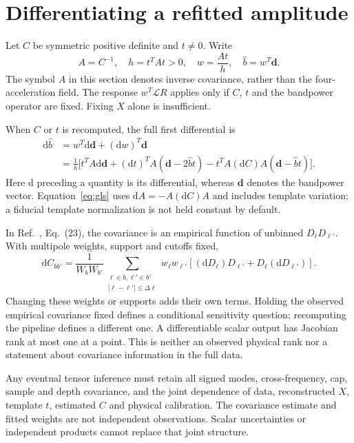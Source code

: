 \documentclass[aps,prd,reprint,onecolumn,notitlepage,nofootinbib]{revtex4-2}
\newcommand{\dd}{\mathrm d}
\newcommand{\vect}[1]{\boldsymbol{#1}}
\begin{document}
\section{Differentiating a refitted amplitude}

Let $C$ be symmetric positive definite and $t\ne0$. Write
\begin{equation}
 A=C^{-1},\quad h=t^TAt>0,\quad w=\frac{At}{h},\quad
 \widehat b=w^T\vect d.
\end{equation}
The symbol $A$ in this section denotes inverse covariance, rather than the four-acceleration field. The response $w^T\mathcal LR$ applies only if $C$, $t$ and the bandpower operator are fixed. Fixing $X$ alone is insufficient.

When $C$ or $t$ is recomputed, the full first differential is
\begin{align}\label{eq:gls}
 \dd\widehat b&=w^T\dd\vect d+(\dd w)^T\vect d\nonumber\\
 &=\frac{1}{h}\Big[
 t^TA\dd\vect d+(\dd t)^TA(\vect d-2\widehat b t)
 -t^TA(\dd C)A(\vect d-\widehat b t)\Big].
\end{align}
Here $\dd$ preceding a quantity is its differential, whereas $\vect d$ denotes the bandpower vector. Equation~\eqref{eq:gls} uses $\dd A=-A(\dd C)A$ and includes template variation; a fiducial template normalization is not held constant by default.

In Ref.~\cite{actdesi}, Eq.~(23), the covariance is an empirical function of unbinned $D_\ell D_{\ell'}$. With multipole weights, support and cutoffs fixed,
\begin{equation}
 \dd C_{bb'}=\frac{1}{W_bW_{b'}}
 \sum_{\substack{\ell\in b,\ell'\in b'\\|\ell-\ell'|\leq\Delta\ell}}
 w_\ell w_{\ell'}\left[(\dd D_\ell)D_{\ell'}+
 D_\ell(\dd D_{\ell'})\right].
\end{equation}
Changing these weights or supports adds their own terms. Holding the observed empirical covariance fixed defines a conditional sensitivity question; recomputing the pipeline defines a different one. A differentiable scalar output has Jacobian rank at most one at a point. This is neither an observed physical rank nor a statement about covariance information in the full data.

Any eventual tensor inference must retain all signed modes, cross-frequency, cap, sample and depth covariance, and the joint dependence of data, reconstructed $X$, template $t$, estimated $C$ and physical calibration. The covariance estimate and fitted weights are not independent observations. Scalar uncertainties or independent products cannot replace that joint structure.
\end{document}
